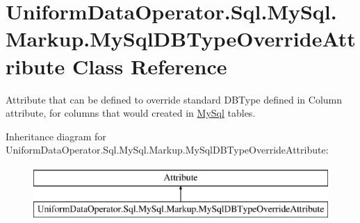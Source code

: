 \hypertarget{class_uniform_data_operator_1_1_sql_1_1_my_sql_1_1_markup_1_1_my_sql_d_b_type_override_attribute}{}\section{Uniform\+Data\+Operator.\+Sql.\+My\+Sql.\+Markup.\+My\+Sql\+D\+B\+Type\+Override\+Attribute Class Reference}
\label{class_uniform_data_operator_1_1_sql_1_1_my_sql_1_1_markup_1_1_my_sql_d_b_type_override_attribute}


Attribute that can be defined to override standard D\+B\+Type defined in Column attribute, for columns that would created in \mbox{\hyperlink{namespace_uniform_data_operator_1_1_sql_1_1_my_sql}{My\+Sql}} tables.  


Inheritance diagram for Uniform\+Data\+Operator.\+Sql.\+My\+Sql.\+Markup.\+My\+Sql\+D\+B\+Type\+Override\+Attribute\+:\begin{figure}[H]
\begin{center}
\leavevmode
\includegraphics[height=2.000000cm]{da/d96/class_uniform_data_operator_1_1_sql_1_1_my_sql_1_1_markup_1_1_my_sql_d_b_type_override_attribute}
\end{center}
\end{figure}
